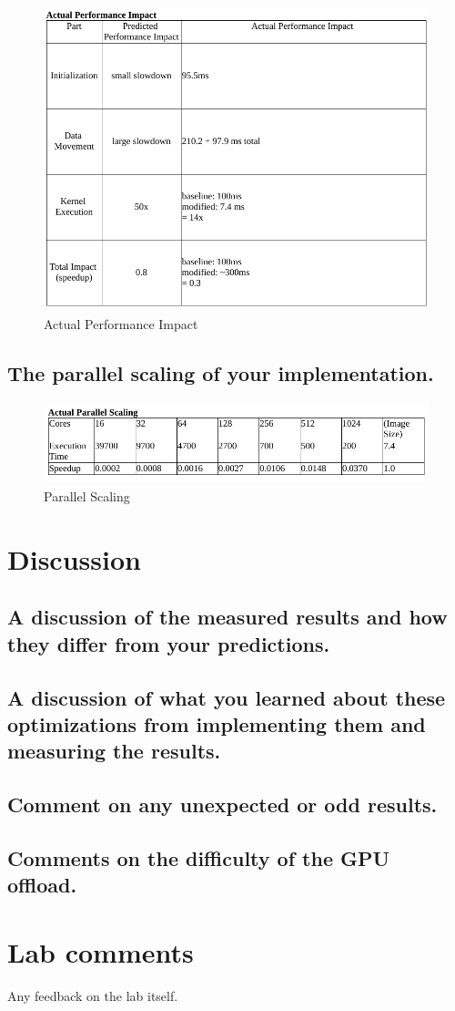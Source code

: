 \documentclass{article}
\begin{document}
\begin{figure}[h!t]
    \centering
    \includegraphics[width=1\textwidth]{actual.png}
    \caption{Actual Performance Impact}
    \label{fig:actual}
\end{figure}

\subsection{The parallel scaling of your implementation.}

\begin{figure}[h!t]
    \centering
    \includegraphics[width=1\textwidth]{parallel.png}
    \caption{Parallel Scaling}
    \label{fig:parallel}
\end{figure}

\section{Discussion}

\subsection{A discussion of the measured results and how they differ from your predictions.}

\subsection{A discussion of what you learned about these optimizations from implementing them and measuring the results.}

\subsection{Comment on any unexpected or odd results.}

\subsection{Comments on the difficulty of the GPU offload.}

\section{Lab comments}
Any feedback on the lab itself.
\end{document}
